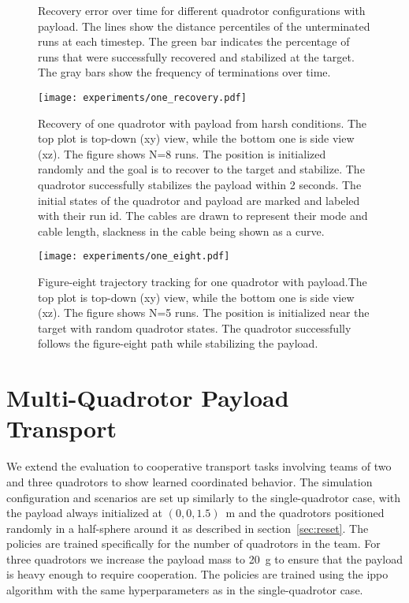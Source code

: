 \begin{figure}[H]
  \caption[Recovery Error Comparison]{Recovery error over time for different quadrotor configurations with payload. The lines show the distance percentiles of the unterminated runs at each timestep. The green bar indicates the percentage of runs that were successfully recovered and stabilized at the target. The gray bars show the frequency of terminations over time.}
  \label{fig:single_quad_payload_subfigs}
\end{figure}



\begin{figure}[H]
    \centering
    
    \texttt{[image: experiments/one\_recovery.pdf]}
    \caption[Single Quadrotor Harsh Recovery Trajectory]{Recovery of one quadrotor with payload from harsh conditions. The top plot is top-down  (xy) view, while the bottom one is side view (xz).
    The figure shows N=8 runs. The position is initialized randomly and the goal is to recover to the target and stabilize. The quadrotor successfully stabilizes the payload within 2 seconds. The initial states of the quadrotor and payload are marked and labeled with their run id. The cables are drawn to represent their mode and cable length, slackness in the cable being shown as a curve.}
    \label{fig:one_recovery}
\end{figure}
\begin{figure}[H]
    \centering
    
    \texttt{[image: experiments/one\_eight.pdf]}
    \caption[Single Quadrotor Figure-Eight Tracking]{Figure-eight trajectory tracking for one quadrotor with payload.The top plot is top-down  (xy) view, while the bottom one is side view (xz). The figure shows N=5 runs. The position is initialized near the target with random quadrotor states. The quadrotor successfully follows the figure-eight path while stabilizing the payload.}
    \label{fig:one_eight}
\end{figure}

\section{Multi-Quadrotor Payload Transport}
We extend the evaluation to cooperative transport tasks involving teams of two and three quadrotors to show learned coordinated behavior. The simulation configuration and scenarios are set up similarly to the single-quadrotor case, with the payload always initialized at $(0,0,1.5)$~m and the quadrotors positioned randomly in a half-sphere around it as described in section~\ref{sec:reset}. The policies are trained specifically for the number of quadrotors in the team. For three quadrotors we increase the payload mass to 20~g to ensure that the payload is heavy enough to require cooperation. The policies are trained using the \gls{ippo} algorithm with the same hyperparameters as in the single-quadrotor case.


